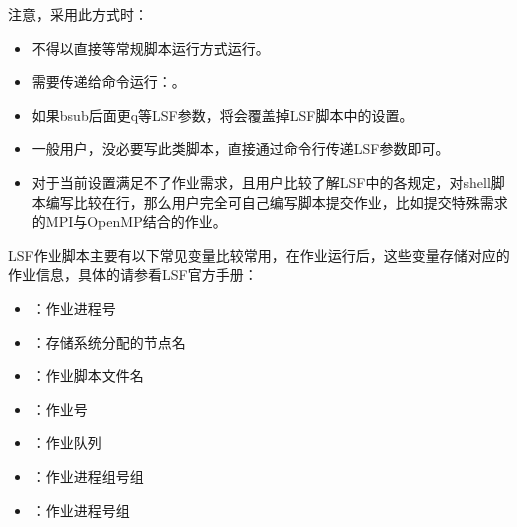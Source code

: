 \documentclass[a4paper,12pt,english]{sphinxmanual}
\begin{document}
\sphinxAtStartPar
注意，采用此方式时：
\begin{itemize}
\item {} 
\sphinxAtStartPar
不得以直接等常规脚本运行方式运行。

\item {} 
\sphinxAtStartPar
需要传递给命令运行：。

\item {} 
\sphinxAtStartPar
如果bsub后面更\sphinxhyphen{}q等LSF参数，将会覆盖掉LSF脚本中的设置。

\item {} 
\sphinxAtStartPar
一般用户，没必要写此类脚本，直接通过命令行传递LSF参数即可。

\item {} 
\sphinxAtStartPar
对于当前设置满足不了作业需求，且用户比较了解LSF中的各规定，对shell脚本编写比较在行，那么用户完全可自己编写脚本提交作业，比如提交特殊需求的MPI与OpenMP结合的作业。

\end{itemize}

\sphinxAtStartPar
LSF作业脚本主要有以下常见变量比较常用，在作业运行后，这些变量存储对应的作业信息，具体的请参看LSF官方手册：
\begin{itemize}
\item {} 
\sphinxAtStartPar
{}：作业进程号

\item {} 
\sphinxAtStartPar
{}：存储系统分配的节点名

\item {} 
\sphinxAtStartPar
{}：作业脚本文件名

\item {} 
\sphinxAtStartPar
{}：作业号

\item {} 
\sphinxAtStartPar
{}：作业队列

\item {} 
\sphinxAtStartPar
{}：作业进程组号组

\item {} 
\sphinxAtStartPar
{}：作业进程号组

\end{itemize}
\end{document}
